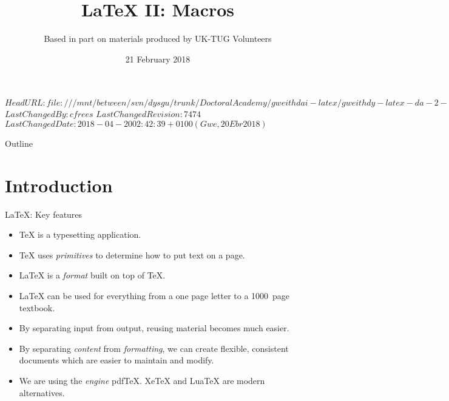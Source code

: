 \svnidlong
{$HeadURL: file:///mnt/between/svn/dysgu/trunk/DoctoralAcademy/gweithdai-latex/gweithdy-latex-da-2-macros/training.tex $}
{$LastChangedBy: cfrees $}
{$LastChangedRevision: 7474 $}
{$LastChangedDate: 2018-04-20 02:42:39 +0100 (Gwe, 20 Ebr 2018) $}



\title{\LaTeX{} II: Macros}
\subtitle{Based in part on materials produced by UK-TUG Volunteers}
\date{ 21 February 2018}




\begin{frame}
  \titlepage
\end{frame}

\maketitle


\tableofcontents

%
{
  \begin{frame}{Outline}
	\tableofcontents
  \end{frame}
}

\section{Introduction}

\begin{frame}{\LaTeX{}: Key features}

  \begin{itemize}
	\item \TeX{} is a typesetting application.
	\item \TeX{} uses \emph{primitives} to determine how to put text on a page.
	\item \LaTeX{} is  a \emph{format} built on top of \TeX{}.
	\item \LaTeX{} can be used for everything from a one page letter to a 1000~page textbook.
	\item By separating input from output, reusing material becomes much easier.
	\item By separating \emph{content} from \emph{formatting}, we can create flexible, consistent documents which are easier to maintain and modify.
	\item We are using the \emph{engine} pdf\TeX{}.
	Xe\TeX{} and Lua\TeX{} are modern alternatives.
  \end{itemize}

\end{frame}

